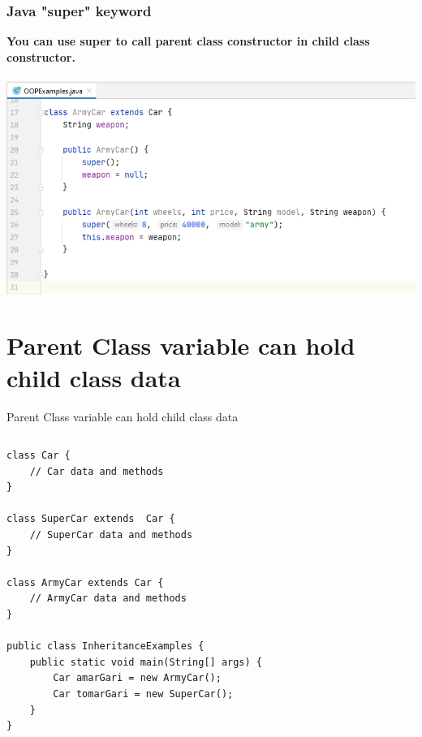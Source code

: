 \documentclass{beamer}
\begin{document}
\begin{frame}
\frametitle{Java "super" keyword}
\textbf{You can use super to call parent class constructor in child class constructor.}\\~\\
\includegraphics[width=\textwidth]{Super.png}
\end{frame}


\section{Parent Class variable can hold child class data}

\begin{frame}[fragile]{Parent Class variable can hold child class data}
\begin{columns}[T]
\begin{column}{\textwidth}
\begin{lstlisting}
class Car {
    // Car data and methods
}

class SuperCar extends  Car {
    // SuperCar data and methods
}

class ArmyCar extends Car {
    // ArmyCar data and methods
}

public class InheritanceExamples {
    public static void main(String[] args) {
        Car amarGari = new ArmyCar();
        Car tomarGari = new SuperCar();
    }
}

\end{lstlisting}
\end{column}
\end{columns}
\end{frame}




\end{document}
